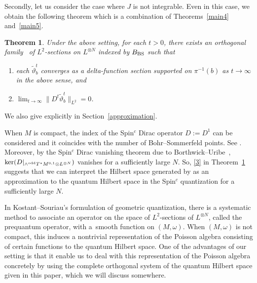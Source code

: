 \documentclass[pdftex]{sigma}
\numberwithin{equation}{section}
\newtheorem{Theorem}{Theorem}[section]
\renewcommand{\tilde}{\widetilde}
\begin{document}
Secondly, let us consider the case where $J$ is not integrable. Even in this case, we obtain the following theorem which is a combination of Theorems~\ref{main4} and~\ref{main5}.
\begin{Theorem}\label{main non-integrable case}
Under the above setting, for each $t>0$, there exists an orthogonal family~\smash{$\big\{{\tilde \vartheta}^t_b\big\}_{b\in B_{\rm BS}}$} of $L^2$-sections on $L^{\otimes N}$ indexed by $B_{\rm BS}$ such that
\begin{enumerate}\itemsep=0pt
\item[$(1)$] each ${\tilde \vartheta}^t_b$ converges as a delta-function section supported on $\pi^{-1}(b)$ as $t\to \infty$ in the above sense, and
\item[$(2)$] $\displaystyle \lim_{t\to \infty}\big\|D^t {\tilde \vartheta}^t_b\big\|_{L^2}=0$.\label{3}
\end{enumerate}
\end{Theorem}
We also give \smash{$\big\{\tilde \vartheta^t_b\big\}_{b\in B_{\rm BS}}$} explicitly in Section~\ref{approximation}.

When $M$ is compact, the index of the Spin${}^c$ Dirac operator $D:=D^1$ can be considered and it coincides with the number of Bohr--Sommerfeld points. See \cite{FFY1}. Moreover, by the Spin${}^c$ Dirac vanishing theorem due to Borthwick--Uribe~\cite{BU}, $\ker ( D|_{\wedge^{\rm odd}T^*M^{0,1}\otimes L^{\otimes N}})$ vanishes for a sufficiently large $N$. So, \eqref{3} in Theorem~\ref{main non-integrable case} suggests that we can interpret the Hilbert space generated by \smash{$\big\{{\tilde \vartheta}^t_b\big\}_{b\in B_{\rm BS}}$} as an approximation to the quantum Hilbert space in the Spin${}^c$ quantization for a sufficiently large $N$.

In Kostant--Souriau's formulation of geometric quantization, there is a systematic method to associate an operator on the space of $L^2$-sections of $L^{\otimes N}$, called the prequantum operator, with a~smooth function on $(M,\omega)$. When $(M,\omega)$ is not compact, this induces a nontrivial representation of the Poisson algebra consisting of certain functions to the quantum Hilbert space.
One of the advantages of our setting is that it enable us to deal with this representation of the Poisson algebra concretely by using the complete orthogonal system of the quantum Hilbert space given in this paper, which we will discuss somewhere.
\end{document}
